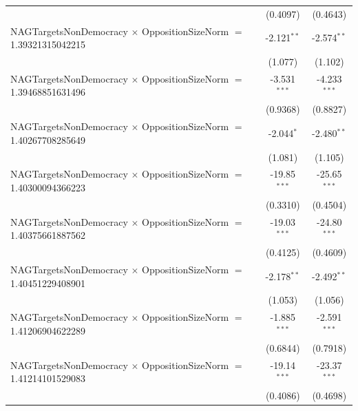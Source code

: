 \begin{tabular}{lcc}
                                                                                & (0.4097)             & (0.4643)\\   
   NAGTargetsNonDemocracy $\times$ OppositionSizeNorm $=$ 1.39321315042215      & -2.121$^{**}$        & -2.574$^{**}$\\   
                                                                                & (1.077)              & (1.102)\\   
   NAGTargetsNonDemocracy $\times$ OppositionSizeNorm $=$ 1.39468851631496      & -3.531$^{***}$       & -4.233$^{***}$\\   
                                                                                & (0.9368)             & (0.8827)\\   
   NAGTargetsNonDemocracy $\times$ OppositionSizeNorm $=$ 1.40267708285649      & -2.044$^{*}$         & -2.480$^{**}$\\   
                                                                                & (1.081)              & (1.105)\\   
   NAGTargetsNonDemocracy $\times$ OppositionSizeNorm $=$ 1.40300094366223      & -19.85$^{***}$       & -25.65$^{***}$\\   
                                                                                & (0.3310)             & (0.4504)\\   
   NAGTargetsNonDemocracy $\times$ OppositionSizeNorm $=$ 1.40375661887562      & -19.03$^{***}$       & -24.80$^{***}$\\   
                                                                                & (0.4125)             & (0.4609)\\   
   NAGTargetsNonDemocracy $\times$ OppositionSizeNorm $=$ 1.40451229408901      & -2.178$^{**}$        & -2.492$^{**}$\\   
                                                                                & (1.053)              & (1.056)\\   
   NAGTargetsNonDemocracy $\times$ OppositionSizeNorm $=$ 1.41206904622289      & -1.885$^{***}$       & -2.591$^{***}$\\   
                                                                                & (0.6844)             & (0.7918)\\   
   NAGTargetsNonDemocracy $\times$ OppositionSizeNorm $=$ 1.41214101529083      & -19.14$^{***}$       & -23.37$^{***}$\\   
                                                                                & (0.4086)             & (0.4698)\\   

\end{tabular}
